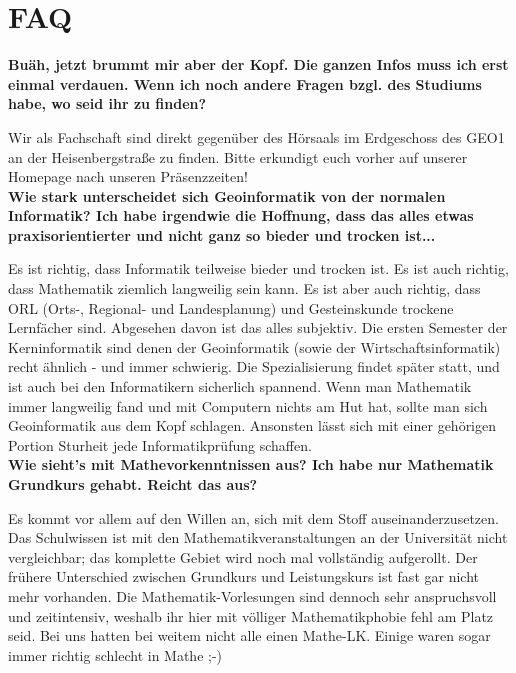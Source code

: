 \newpage

\section*{FAQ} %
\textbf{Buäh, jetzt brummt mir aber der Kopf. Die ganzen Infos muss ich erst einmal verdauen. Wenn ich noch andere Fragen bzgl. des Studiums habe, wo seid ihr zu finden?}

Wir als Fachschaft sind direkt gegenüber des Hörsaals im Erdgeschoss des GEO1 an der Heisenbergstraße zu finden. Bitte erkundigt euch vorher auf unserer Homepage nach unseren Präsenzzeiten!\\

\textbf{Wie stark unterscheidet sich Geoinformatik von der normalen Informatik? Ich habe irgendwie die Hoffnung, dass das alles etwas praxisorientierter und nicht ganz so bieder und trocken ist...}

Es ist richtig, dass Informatik teilweise bieder und trocken ist. Es ist auch richtig, dass Mathematik ziemlich langweilig sein kann. Es ist aber auch richtig, dass ORL (Orts-, Regional- und Landesplanung) und Gesteinskunde trockene Lernfächer sind. Abgesehen davon ist das alles subjektiv. Die ersten Semester der Kerninformatik sind denen der Geoinformatik (sowie der Wirtschaftsinformatik) recht ähnlich - und immer schwierig. Die Spezialisierung ﬁndet später statt, und ist auch bei den Informatikern sicherlich spannend. Wenn man Mathematik immer langweilig fand und mit Computern nichts am Hut hat, sollte man sich Geoinformatik aus dem Kopf schlagen. Ansonsten lässt sich mit einer gehörigen Portion Sturheit jede Informatikprüfung schaffen.\\

\textbf{Wie sieht's mit Mathevorkenntnissen aus? Ich habe nur Mathematik Grundkurs gehabt. Reicht das aus?}

Es kommt vor allem auf den Willen an, sich mit dem Stoff auseinanderzusetzen. Das Schulwissen ist mit den Mathematikveranstaltungen an der Universität nicht vergleichbar; das komplette Gebiet wird noch mal vollständig aufgerollt. Der frühere Unterschied zwischen Grundkurs und Leistungskurs ist fast gar nicht mehr vorhanden. Die Mathematik-Vorlesungen sind dennoch sehr anspruchsvoll und zeitintensiv, weshalb ihr hier mit völliger Mathematikphobie fehl am Platz seid. Bei uns hatten bei weitem nicht alle einen Mathe-LK. Einige waren sogar immer richtig schlecht in Mathe ;-)\\

